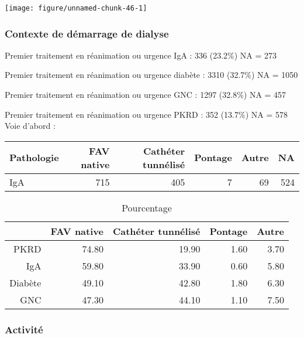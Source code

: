 \documentclass[11pt,a4paper]{article}\usepackage[]{graphicx}\usepackage[]{color}
\makeatletter
\def\maxwidth{ %
  \ifdim\Gin@nat@width>\linewidth
    \linewidth
  \else
    \Gin@nat@width
  \fi
}
\makeatother
\begin{document}
\texttt{[image: figure/unnamed-chunk-46-1]} 


    \subsubsection{Contexte de démarrage de dialyse}



    
Premier traitement en réanimation ou urgence IgA :  336 (23.2\%) NA = 273

Premier traitement en réanimation ou urgence diabète :  3310 (32.7\%) NA = 1050

Premier traitement en réanimation ou urgence GNC :  1297 (32.8\%) NA = 457

Premier traitement en réanimation ou urgence PKRD :  352 (13.7\%) NA = 578
~\\

Voie d’abord :
\begin{table}[ht]
\centering
\begin{tabular}{lrrrrr}
  \hline
Pathologie & FAV native & Cathéter tunnélisé & Pontage & Autre & NA \\ 
  \hline
IgA & 715 & 405 &   7 &  69 & 524 \\ 
   \hline
\end{tabular}
\end{table}
\begin{table}[ht]
\centering
\begin{tabular}{rrrrr}
  \hline
 & FAV native & Cathéter tunnélisé & Pontage & Autre \\ 
  \hline
PKRD & 74.80 & 19.90 & 1.60 & 3.70 \\ 
  IgA & 59.80 & 33.90 & 0.60 & 5.80 \\ 
  Diabète & 49.10 & 42.80 & 1.80 & 6.30 \\ 
  GNC & 47.30 & 44.10 & 1.10 & 7.50 \\ 
   \hline
\end{tabular}
\caption{Pourcentage} 
\end{table}


    \subsubsection{Activité}
\end{document}
